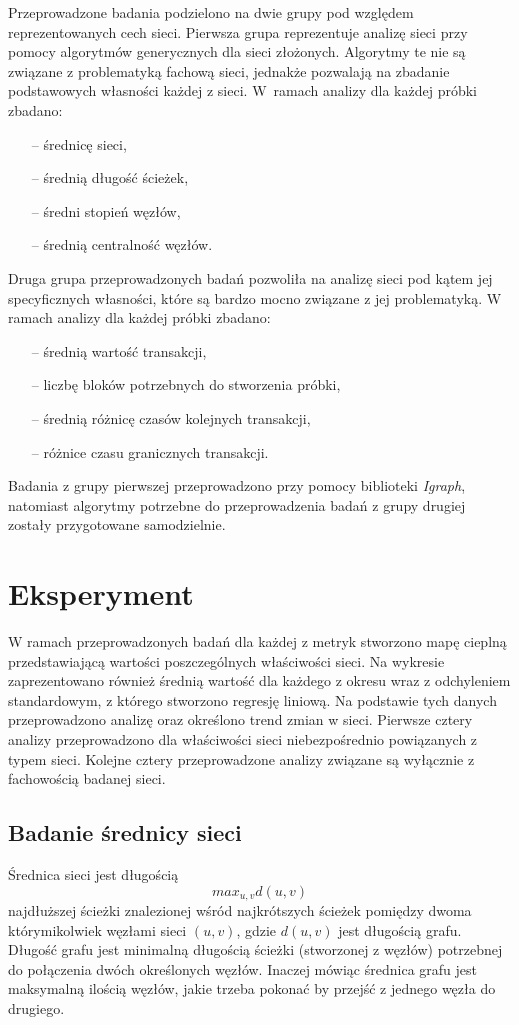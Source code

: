 \documentclass[12pt, twoside, final, openany]{mgr}
\begin{document}
\indent Przeprowadzone badania podzielono na dwie grupy pod względem reprezentowanych cech sieci. Pierwsza grupa reprezentuje analizę sieci przy pomocy algorytmów generycznych dla sieci złożonych. Algorytmy te nie są związane z problematyką fachową sieci, jednakże pozwalają na zbadanie podstawowych własności każdej z sieci. W~ramach analizy dla każdej próbki zbadano:
\begin{itemize}
\item[--] średnicę sieci,
\item[--] średnią długość ścieżek,
\item[--] średni stopień węzłów,
\item[--] średnią centralność węzłów.
\end{itemize}
Druga grupa przeprowadzonych badań pozwoliła na analizę sieci pod kątem jej specyficznych własności, które są bardzo mocno związane z jej problematyką. W ramach analizy dla każdej próbki zbadano:
\begin{itemize}
\item[--] średnią wartość transakcji,
\item[--] liczbę bloków potrzebnych do stworzenia próbki,
\item[--] średnią różnicę czasów kolejnych transakcji,
\item[--] różnice czasu granicznych transakcji.
\end{itemize}

\indent Badania z grupy pierwszej przeprowadzono przy pomocy biblioteki \textit{Igraph}, natomiast algorytmy potrzebne do przeprowadzenia badań z grupy drugiej zostały przygotowane samodzielnie.

\section{Eksperyment}
W ramach przeprowadzonych badań dla każdej z metryk stworzono mapę cieplną przedstawiającą wartości poszczególnych właściwości sieci. Na wykresie zaprezentowano również średnią wartość dla każdego z okresu wraz z odchyleniem standardowym, z którego stworzono regresję liniową. Na podstawie tych danych przeprowadzono analizę oraz określono trend zmian w sieci. Pierwsze cztery analizy przeprowadzono dla właściwości sieci niebezpośrednio powiązanych z typem sieci. Kolejne cztery przeprowadzone analizy związane są wyłącznie z fachowością badanej sieci.

\subsection{Badanie średnicy sieci}
\label{srednica_sieci}
\indent Średnica sieci jest długością 
\begin{equation}
\label{eq:srednica_sieci}
	max_{u,v}d(u,v)
\end{equation}
najdłuższej ścieżki znalezionej wśród najkrótszych ścieżek pomiędzy dwoma którymikolwiek węzłami sieci $(u,v)$, gdzie $d(u,v)$ jest długością grafu\cite{barabasi2016network}. Długość grafu jest minimalną długością ścieżki (stworzonej z węzłów) potrzebnej do połączenia dwóch określonych węzłów. Inaczej mówiąc średnica grafu jest maksymalną ilością węzłów, jakie trzeba pokonać by przejść z jednego węzła do drugiego.
\end{document}
